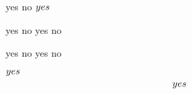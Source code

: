 \documentclass{article}
\begin{document}
\vspace*{\fill}\vspace{-5ex}

\def\testm{\ifmmode yes \else no \fi}
\testm $\testm$

\def\testv{\ifvmode yes \else no \fi}
\testv \leavevmode \testv

\def\testh{\ifhmode yes \else no \fi}
\testh \leavevmode \testh

\def\testi{\ifinner yes \else no \fi}
$\testi$ $$\testi$$

\vspace*{\fill}
\end{document}
